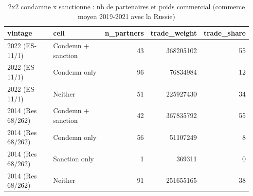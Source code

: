 \begin{table}

\caption{2x2 condamne x sanctionne : nb de partenaires et poids commercial (commerce moyen 2019-2021 avec la Russie)}
\centering
\begin{tabular}[t]{llrrr}
\toprule
vintage & cell & n\_partners & trade\_weight & trade\_share\\
\midrule
2022 (ES-11/1) & Condemn + sanction & 43 & 368205102 & 55\\
2022 (ES-11/1) & Condemn only & 96 & 76834984 & 12\\
2022 (ES-11/1) & Neither & 51 & 225927430 & 34\\
2014 (Res 68/262) & Condemn + sanction & 42 & 367835792 & 55\\
2014 (Res 68/262) & Condemn only & 56 & 51107249 & 8\\
2014 (Res 68/262) & Sanction only & 1 & 369311 & 0\\
2014 (Res 68/262) & Neither & 91 & 251655165 & 38\\
\bottomrule
\end{tabular}
\end{table}
